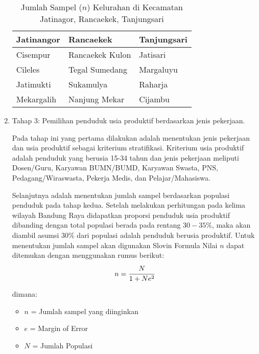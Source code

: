 \documentclass{article}
\begin{document}
\begin{enumerate}
    \begin{table}[ht]
        \centering
        \caption{Jumlah Sampel ($n$) Kelurahan di Kecamatan Jatinagor, Rancaekek, Tanjungsari}
        \label{tabel:psu_kel_2}
        \begin{tabular}{|p{3cm}|p{3cm}|p{3cm}|}
        \hline
        \textbf{Jatinangor} & \textbf{Rancaekek} & \textbf{Tanjungsari} \\ \hline
        Cisempur & Rancaekek Kulon & Jatisari \\ \hline
        Cileles & Tegal Sumedang & Margaluyu \\ \hline
        Jatimukti & Sukamulya  & Raharja  \\ \hline
        Mekargalih & Nanjung Mekar  & Cijambu  \\ \hline
        \end{tabular}
    \end{table}

    \item Tahap 3: Pemilihan penduduk usia produktif berdasarkan jenis pekerjaan. 
    \par\noindent
    Pada tahap ini yang pertama dilakukan adalah  menentukan jenis pekerjaan dan usia produktif sebagai kriterium stratifikasi. Kriterium usia produktif adalah penduduk yang berusia 15-34 tahun dan jenis pekerjaan meliputi Dosen/Guru, Karyawan BUMN/BUMD, Karyawan Swasta, PNS, Pedagang/Wiraswasta, Pekerja Medis, dan Pelajar/Mahasiswa.

    Selanjutnya adalah menentukan jumlah sampel berdasarkan populasi penduduk pada tahap kedua. Setelah melakukan perhitungan pada kelima wilayah Bandung Raya didapatkan proporsi penduduk usia produktif dibanding dengan total populasi berada pada rentang $30-35\%$, maka akan diambil asumsi $30\%$ dari populasi adalah penduduk berusia produktif. Untuk menentukan jumlah sampel akan digunakan Slovin Formula Nilai $n$ dapat ditemukan dengan menggunakan rumus berikut:
    \begin{align}
        n = \cfrac{N}{1 + Ne^{2}}
    \end{align}

    dimana:
    \begin{itemize}
        \item $n$ = Jumlah sampel yang diinginkan
        \item $e$ = Margin of Error
        \item $N$ = Jumlah Populasi
    \end{itemize}


\end{enumerate}
\end{document}
